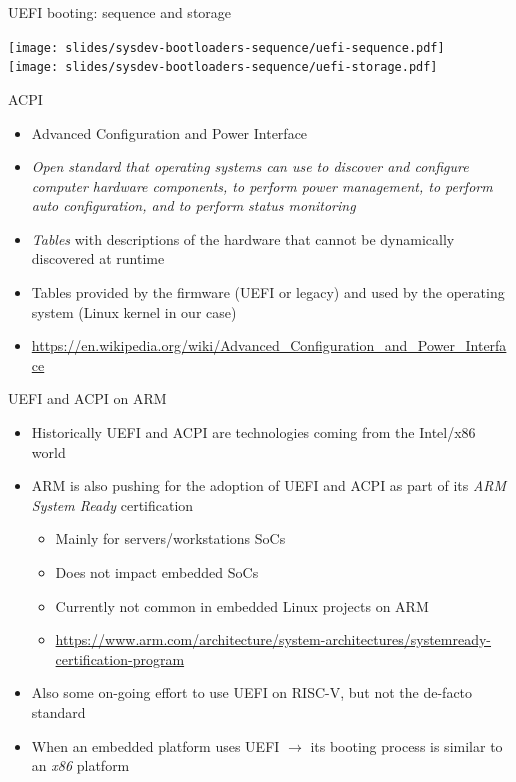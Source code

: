 \begin{frame}{UEFI booting: sequence and storage}
  \begin{center}
    \vspace{0.5cm}
    \texttt{[image: slides/sysdev-bootloaders-sequence/uefi-sequence.pdf]}\\
    \vspace{0.5cm}
    \texttt{[image: slides/sysdev-bootloaders-sequence/uefi-storage.pdf]}\\
  \end{center}
\end{frame}

\begin{frame}{ACPI}
  \begin{itemize}
  \item Advanced Configuration and Power Interface
  \item {\em Open standard that operating systems can use to discover
      and configure computer hardware components, to perform power
      management, to perform auto configuration, and to perform status
      monitoring}
  \item {\em Tables} with descriptions of the hardware that cannot be
    dynamically discovered at runtime
  \item Tables provided by the firmware (UEFI or legacy) and used by
    the operating system (Linux kernel in our case)
  \item \small \url{https://en.wikipedia.org/wiki/Advanced_Configuration_and_Power_Interface}
  \end{itemize}
\end{frame}

\begin{frame}{UEFI and ACPI on ARM}
  \begin{itemize}
  \item Historically UEFI and ACPI are technologies coming from the
    Intel/x86 world
  \item ARM is also pushing for the adoption of UEFI and ACPI as part
    of its {\em ARM System Ready} certification
    \begin{itemize}
    \item Mainly for servers/workstations SoCs
    \item Does not impact embedded SoCs
    \item Currently not common in embedded Linux projects on ARM
    \item \url{https://www.arm.com/architecture/system-architectures/systemready-certification-program}
    \end{itemize}
  \item Also some on-going effort to use UEFI on RISC-V, but not the
    de-facto standard
  \item When an embedded platform uses UEFI $\rightarrow$ its booting
    process is similar to an {\em x86} platform
  \end{itemize}
\end{frame}

